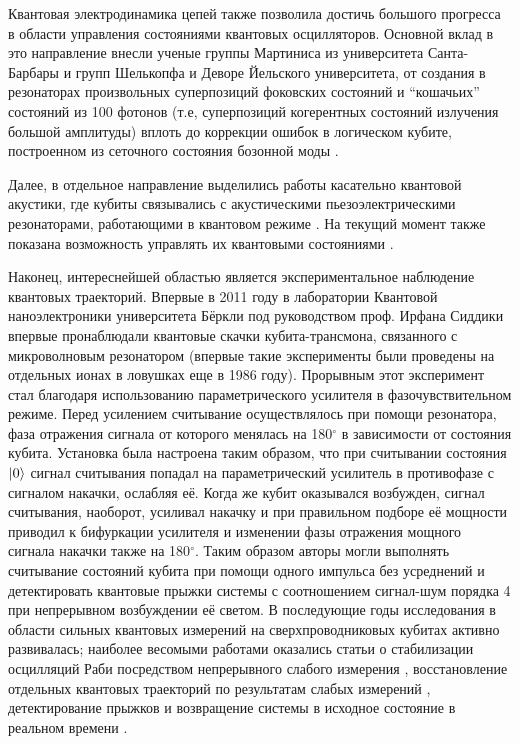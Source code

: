 \documentclass[14pt, a4paper]{extreport}
\DeclarePairedDelimiter\ket{\lvert}{\rangle}
\numberwithin{equation}{section}
\begin{document}
Квантовая электродинамика цепей также позволила достичь большого прогресса в области управления состояниями квантовых осцилляторов. Основной вклад в это направление внесли ученые группы Мартиниса из университета Санта-Барбары и групп Шелькопфа и Деворе Йельского университета, от создания в резонаторах произвольных суперпозиций фоковских состояний \cite{hofheinz2009synthesizing} и ``кошачьих'' состояний \cite{vlastakis2013deterministically} из 100 фотонов (т.е, суперпозиций когерентных состояний излучения большой амплитуды) вплоть до коррекции ошибок в логическом кубите, построенном из сеточного состояния бозонной моды \cite{campagne2020quantum}.

Далее, в отдельное направление выделились работы касательно квантовой акустики, где кубиты связывались с акустическими пьезоэлектрическими резонаторами, работающими в квантовом режиме \cite{chu2017quantum, bolgar2018quantum}. На текущий момент также показана возможность управлять их квантовыми состояниями \cite{satzinger2018quantum}.

Наконец, интереснейшей областью является экспериментальное наблюдение квантовых траекторий. Впервые в 2011 году в лаборатории Квантовой наноэлектроники университета Бёркли под руководством проф. Ирфана Сиддики впервые пронаблюдали квантовые скачки кубита-трансмона, связанного с микроволновым резонатором \cite{vijay2011observation} (впервые такие эксперименты были проведены на отдельных ионах в ловушках еще в 1986 году). Прорывным этот эксперимент стал благодаря использованию параметрического усилителя в фазочувствительном режиме. Перед усилением считывание осуществлялось при помощи резонатора, фаза отражения сигнала от которого менялась на 180$ ^\circ $ в зависимости от состояния кубита. Установка была настроена таким образом, что при считывании состояния $ \ket{0} $ сигнал считывания попадал на параметрический усилитель в противофазе с сигналом накачки, ослабляя её. Когда же кубит оказывался возбужден, сигнал считывания, наоборот, усиливал накачку и при правильном подборе её мощности приводил к бифуркации усилителя и изменении фазы отражения мощного сигнала накачки также на 180$ ^\circ $. Таким образом авторы могли выполнять считывание состояний кубита при помощи одного импульса без усреднений и детектировать квантовые прыжки системы с соотношением сигнал-шум порядка 4 при непрерывном возбуждении её светом. В последующие годы исследования в области сильных квантовых измерений на сверхпроводниковых кубитах активно развивалась; наиболее весомыми работами оказались статьи о стабилизации осцилляций Раби посредством непрерывного слабого измерения \cite{vijay2012stabilizing}, восстановление отдельных квантовых траекторий по результатам слабых измерений  \cite{murch2013observing}, детектирование прыжков и возвращение системы в исходное состояние в реальном времени \cite{minev2019catch}.
\end{document}
